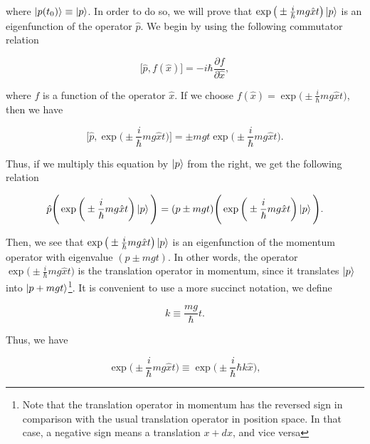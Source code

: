 \documentclass{article}
\begin{document}
where $\ket{p(t_{0})} \equiv \ket{p}$. In order to do so, we will prove that $\exp \big(\pm \frac{i}{\hbar} mg \hat{x} t \big) \ket{p}$ is an eigenfunction of the operator $\hat{p}$. We begin by using the following commutator relation

\begin{equation}
    \big[ \hat{p}, f(\hat{x}) \big] = -i \hbar \frac{\partial f}{\partial \hat{x}},
\end{equation}

where $f$ is a function of the operator $\hat{x}$. If we choose $f(\hat{x})= \exp \big(\pm \frac{i}{\hbar} mg \hat{x} t \big) $, then we have

\begin{equation}
    \bigg[ \hat{p}, \exp \bigg(\pm \frac{i}{\hbar} mg \hat{x} t \bigg) \bigg] = \pm mgt \exp \bigg(\pm \frac{i}{\hbar} mg \hat{x} t \bigg).
\end{equation}

Thus, if we multiply this equation by $\ket{p}$ from the right, we get the following relation

\begin{equation}
    \hat{p} \Bigg( \exp \bigg(\pm \frac{i}{\hbar} mg \hat{x} t \bigg) \ket{p} \Bigg) = (p\pm mgt) \Bigg( \exp \bigg(\pm \frac{i}{\hbar} mg \hat{x} t \bigg) \ket{p} \Bigg).
\end{equation}

Then, we see that $\exp \big(\pm \frac{i}{\hbar} mg \hat{x} t \big) \ket{p}$ is an eigenfunction of the momentum operator with eigenvalue $(p\pm mgt)$. In other words, the operator $\exp \big(\pm \frac{i}{\hbar} mg \hat{x} t \big)$ is the translation operator in momentum, since it translates $\ket{p}$ into $\ket{p+mgt}$\footnote{Note that the translation operator in momentum has the reversed sign in comparison with the usual translation operator in position space. In that case, a negative sign means a translation $x+dx$, and vice versa}. It is convenient to use a more succinct notation, we define

\begin{equation}
    k \equiv \frac{mg}{\hbar} t.
\end{equation}

Thus, we have

\begin{equation}
    \exp \bigg(\pm \frac{i}{\hbar} mg \hat{x} t \bigg) \equiv \exp \bigg(\pm \frac{i}{\hbar} \hbar k \hat{x} \bigg),
\end{equation}
\end{document}
